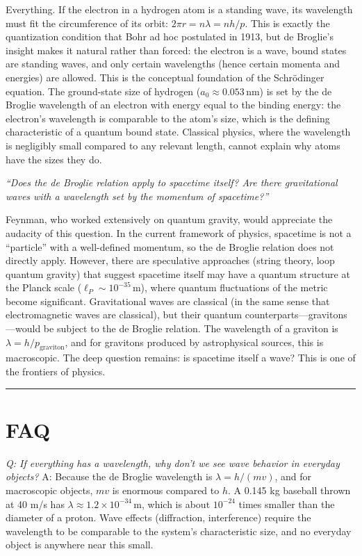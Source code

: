 \documentclass[11pt,openright]{book}
\begin{document}
Everything. If the electron in a hydrogen atom is a standing wave, its wavelength must fit the circumference of its orbit: $2\pi r = n\lambda = nh/p$. This is exactly the quantization condition that Bohr ad hoc postulated in 1913, but de Broglie's insight makes it natural rather than forced: the electron is a wave, bound states are standing waves, and only certain wavelengths (hence certain momenta and energies) are allowed. This is the conceptual foundation of the Schrödinger equation. The ground-state size of hydrogen ($a_0 \approx 0.053\,\text{nm}$) is set by the de Broglie wavelength of an electron with energy equal to the binding energy: the electron's wavelength is comparable to the atom's size, which is the defining characteristic of a quantum bound state. Classical physics, where the wavelength is negligibly small compared to any relevant length, cannot explain why atoms have the sizes they do.

\textit{``Does the de Broglie relation apply to spacetime itself? Are there gravitational waves with a wavelength set by the momentum of spacetime?''}

Feynman, who worked extensively on quantum gravity, would appreciate the audacity of this question. In the current framework of physics, spacetime is not a ``particle'' with a well-defined momentum, so the de Broglie relation does not directly apply. However, there are speculative approaches (string theory, loop quantum gravity) that suggest spacetime itself may have a quantum structure at the Planck scale ($\ell_P \sim 10^{-35}\,\text{m}$), where quantum fluctuations of the metric become significant. Gravitational waves are classical (in the same sense that electromagnetic waves are classical), but their quantum counterparts---gravitons---would be subject to the de Broglie relation. The wavelength of a graviton is $\lambda = h/p_{\text{graviton}}$, and for gravitons produced by astrophysical sources, this is macroscopic. The deep question remains: is spacetime itself a wave? This is one of the frontiers of physics.

\bigskip
\hrule
\bigskip
\section*{FAQ}

\textit{Q: If everything has a wavelength, why don't we see wave behavior in everyday objects?}
A: Because the de Broglie wavelength is $\lambda = h/(mv)$, and for macroscopic objects, $mv$ is enormous compared to $h$. A 0.145 kg baseball thrown at 40 m/s has $\lambda \approx 1.2\times 10^{-34}\,\text{m}$, which is about $10^{-24}$ times smaller than the diameter of a proton. Wave effects (diffraction, interference) require the wavelength to be comparable to the system's characteristic size, and no everyday object is anywhere near this small.
\end{document}
